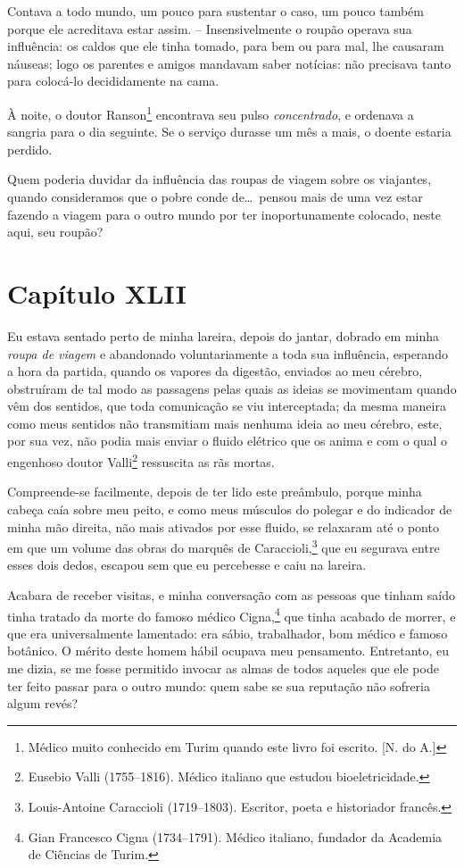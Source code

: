 Contava a todo mundo, um pouco para sustentar o caso, um pouco também
porque ele acreditava estar assim. -- Insensivelmente o roupão operava
sua influência: os caldos que ele tinha tomado, para bem ou para mal,
lhe causaram náuseas; logo os parentes e amigos mandavam saber
notícias: não precisava tanto para colocá-lo decididamente na cama. 

 À noite, o doutor Ranson\footnote{ Médico muito conhecido em Turim
quando este livro foi escrito. [N. do A.]} encontrava seu pulso
\textit{concentrado}, e ordenava a sangria para o dia seguinte. Se o
serviço durasse um mês a mais, o doente estaria perdido.

 Quem poderia duvidar da influência das roupas de viagem sobre os
viajantes, quando consideramos que o pobre conde de\ldots\ pensou mais de
uma vez estar fazendo a viagem para o outro mundo por ter
inoportunamente colocado, neste aqui, seu roupão?

\section{Capítulo XLII}

 Eu estava sentado perto de minha lareira, depois do jantar, dobrado em
minha \textit{roupa de viagem} e abandonado voluntariamente a toda sua
influência, esperando a hora da partida, quando os vapores da digestão,
enviados ao meu cérebro, obstruíram de tal modo as passagens pelas
quais as ideias se movimentam quando vêm dos sentidos, que toda
comunicação se viu interceptada; da mesma maneira como meus sentidos
não transmitiam mais nenhuma ideia ao meu cérebro, este, por sua vez,
não podia mais enviar o fluido elétrico que os anima e com o qual o
engenhoso doutor Valli\footnote{ Eusebio Valli (1755--1816). Médico
italiano que estudou bioeletricidade.} ressuscita as rãs mortas. 

Compreende-se facilmente, depois de ter lido este preâmbulo, porque
minha cabeça caía sobre meu peito, e como meus músculos do polegar e do
indicador de minha mão direita, não mais ativados por esse fluido, se
relaxaram até o ponto em que um volume das obras do marquês de
Caraccioli,\footnote{ Louis-Antoine Caraccioli (1719--1803). Escritor,
poeta e historiador francês.} que eu segurava entre esses dois
dedos, escapou sem que eu percebesse e caiu na lareira. 

Acabara de receber visitas, e minha conversação com as pessoas que
tinham saído tinha tratado da morte do famoso médico Cigna,\footnote{ Gian 
Francesco Cigna (1734--1791). Médico italiano, fundador da Academia
de Ciências de Turim.} que tinha acabado de morrer, e que era
universalmente lamentado: era sábio, trabalhador, bom médico e famoso
botânico. O mérito deste homem hábil ocupava meu pensamento.
Entretanto, eu me dizia, se me fosse permitido invocar as almas de
todos aqueles que ele pode ter feito passar para o outro mundo: quem
sabe se sua reputação não sofreria algum revés?


